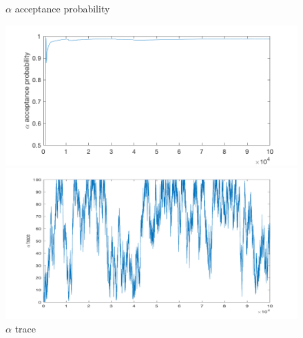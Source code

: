 \documentclass{siamart1116}
\begin{document}
\begin{figure}[!htb]
    \begin{minipage}{0.48\textwidth}
        \centering
        \caption{\label{fig:hier_sim_1} $\alpha$ acceptance probability}
        \includegraphics[width=\linewidth]{graphics/noncentered/acceptance_alpha_probability.png}
    \end{minipage} \hfill
    \begin{minipage}{0.48\textwidth}
        \centering
        \caption{\label{fig:hier_sim_2} $\alpha$ trace}
        \includegraphics[width=\linewidth]{graphics/noncentered/trace_alpha.png}
    \end{minipage}
\end{figure}
\end{document}
